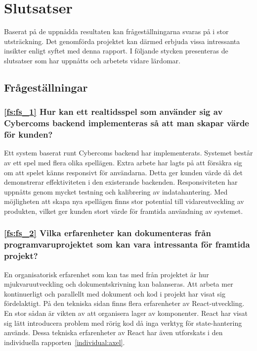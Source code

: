 \chapter{Slutsatser}
\label{cha:slutsatser}

Baserat på de uppnådda resultaten kan frågeställningarna svaras på i stor utsträckning. Det genomförda projektet kan därmed erbjuda vissa intressanta insikter enligt syftet med denna rapport. I följande stycken presenteras de slutsatser som har uppnåtts och arbetets vidare lärdomar.

\section{Frågeställningar}

\subsection*{\ref{fs:fs_1} Hur kan ett realtidsspel som använder sig av Cybercoms backend implementeras så att man skapar värde för kunden?}

Ett system baserat runt Cybercoms backend har implementerats. Systemet består av ett spel med flera olika spellägen. Extra arbete har lagts på att försäkra sig om att spelet känns responsivt för användarna. Detta ger kunden värde då det demonstrerar effektiviteten i den existerande backenden. Responsiviteten har uppnåtts genom mycket testning och kalibrering av indatahantering. Med möjligheten att skapa nya spellägen finns stor potential till vidareutveckling av produkten, vilket ger kunden stort värde för framtida användning av systemet.

\subsection*{\ref{fs:fs_2} Vilka erfarenheter kan dokumenteras från programvaruprojektet som kan vara intressanta för framtida projekt?}

En organisatorisk erfarenhet som kan tas med från projektet är hur mjukvaruutveckling och dokumentskrivning kan balanseras. Att arbeta mer kontinuerligt och parallellt med dokument och kod i projekt har visat sig fördelaktigt. På den tekniska sidan finns flera erfarenheter av React-utveckling. En stor sådan är vikten av att organisera lager av komponenter. React har visat sig lätt introducera problem med rörig kod då inga verktyg för state-hantering används. Dessa tekniska erfarenheter av React har även utforskats i den individuella \mbox{rapporten \ref{individual:axel}.}

